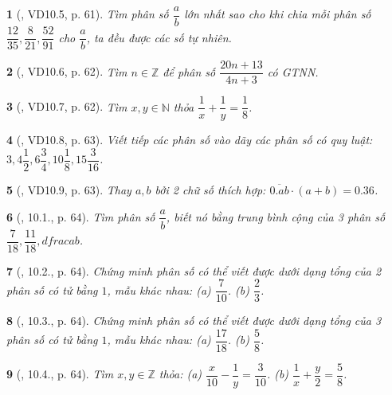 \documentclass{article}
\newtheorem{baitoan}{}
\begin{document}
\begin{baitoan}[\cite{TLCT_THCS_Toan_6_so_hoc}, VD10.5, p. 61]
	Tìm phân số $\dfrac{a}{b}$ lớn nhất sao cho khi chia mỗi phân số $\dfrac{12}{35},\dfrac{8}{21},\dfrac{52}{91}$ cho $\dfrac{a}{b}$, ta đều được các số tự nhiên.
\end{baitoan}

\begin{baitoan}[\cite{TLCT_THCS_Toan_6_so_hoc}, VD10.6, p. 62]
	Tìm $n\in\mathbb{Z}$ để phân số $\dfrac{20n + 13}{4n + 3}$ có {\rm GTNN}.
\end{baitoan}

\begin{baitoan}[\cite{TLCT_THCS_Toan_6_so_hoc}, VD10.7, p. 62]
	Tìm $x,y\in\mathbb{N}$ thỏa $\dfrac{1}{x} + \dfrac{1}{y} = \dfrac{1}{8}$.
\end{baitoan}

\begin{baitoan}[\cite{TLCT_THCS_Toan_6_so_hoc}, VD10.8, p. 63]
	Viết tiếp các phân số vào dãy các phân số có quy luật: $3,4\dfrac{1}{2},6\dfrac{3}{4},10\dfrac{1}{8},15\dfrac{3}{16}$.
\end{baitoan}

\begin{baitoan}[\cite{TLCT_THCS_Toan_6_so_hoc}, VD10.9, p. 63]
	Thay $a,b$ bởi 2 chữ số thích hợp: $\overline{0.ab}\cdot(a + b) = 0.36$.
\end{baitoan}

\begin{baitoan}[\cite{TLCT_THCS_Toan_6_so_hoc}, 10.1., p. 64]
	Tìm phân số $\dfrac{a}{b}$, biết nó bằng trung bình cộng của 3 phân số $\dfrac{7}{18},\dfrac{11}{18},dfrac{a}{b}$.
\end{baitoan}

\begin{baitoan}[\cite{TLCT_THCS_Toan_6_so_hoc}, 10.2., p. 64]
	Chứng minh phân số có thể viết được dưới dạng tổng của 2 phân số có tử bằng $1$, mẫu khác nhau: (a) $\dfrac{7}{10}$. (b) $\dfrac{2}{3}$.
\end{baitoan}

\begin{baitoan}[\cite{TLCT_THCS_Toan_6_so_hoc}, 10.3., p. 64]
	Chứng minh phân số có thể viết được dưới dạng tổng của 3 phân số có tử bằng $1$, mẫu khác nhau: (a) $\dfrac{17}{18}$. (b) $\dfrac{5}{8}$.
\end{baitoan}

\begin{baitoan}[\cite{TLCT_THCS_Toan_6_so_hoc}, 10.4., p. 64]
	Tìm $x,y\in\mathbb{Z}$ thỏa: (a) $\dfrac{x}{10} - \dfrac{1}{y} = \dfrac{3}{10}$. (b) $\dfrac{1}{x} + \dfrac{y}{2} = \dfrac{5}{8}$. 
\end{baitoan}
\end{document}
